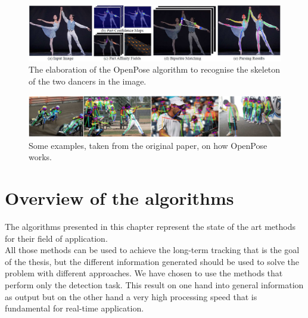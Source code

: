 \begin{figure}[!h]
	\centering
	\includegraphics[width=1\linewidth]{images/detection/howItWorks_openpose}
	\caption{The elaboration of the OpenPose algorithm to recognise the skeleton of the two dancers in the image.}
	\label{fig:howItWorks_openpose}
\end{figure}
\begin{figure}[!h]
	\centering
	\includegraphics[width=1\linewidth]{images/detection/ex_openpose}
	\caption{Some examples, taken from the original paper, on how OpenPose works.}
	\label{fig:ex_openpose}
\end{figure}



\section{Overview of the algorithms}
The algorithms presented in this chapter represent the state of the art methods for their field of application.\\
All those methods can be used to achieve the long-term tracking that is the goal of the thesis, but the different information generated should be used to solve the problem with different approaches. We have chosen to use the methods that perform only the detection task. This result on one hand into general information as output but on the other hand a very high processing speed that is fundamental for real-time application.

